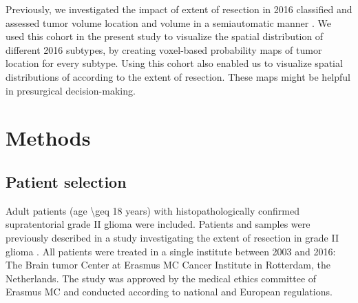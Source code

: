 Previously, we investigated the impact of extent of resection in  2016 classified  and assessed \gls{tumor} volume location and volume in a semiautomatic manner \autocite{wijnenga2017impact}.
We used this cohort in the present study to visualize the spatial distribution of different  2016  subtypes, by creating voxel-based probability maps of \gls{tumor} location for every subtype.
Using this cohort also enabled us to visualize spatial distributions of  according to the extent of resection.
These maps might be helpful in presurgical decision-making.

\section{Methods}
\subsection{Patient selection}
Adult patients (age \num{\geq 18} years) with histopathologically confirmed supratentorial grade II glioma were included.
Patients and samples were previously described in a study investigating the extent of resection in grade II glioma \autocite{wijnenga2017impact}.
All patients were treated in a single institute between 2003 and 2016: The Brain \Gls{tumor} Center at Erasmus MC Cancer Institute in Rotterdam, the Netherlands.
The study was approved by the medical ethics committee of Erasmus MC and conducted according to national and European regulations.

